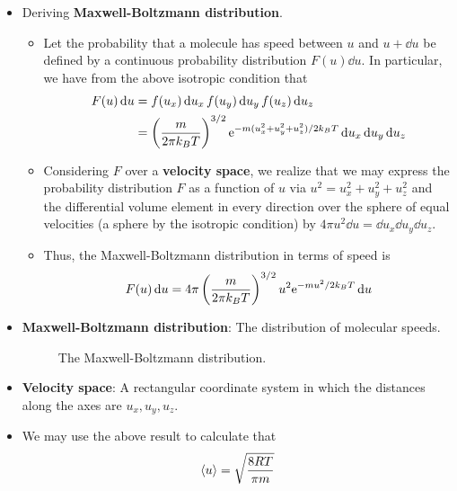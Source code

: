 \documentclass[../notes.tex]{subfiles}
\begin{document}
\begin{itemize}
    \item Deriving \textbf{Maxwell-Boltzmann distribution}.
    \begin{itemize}
        \item Let the probability that a molecule has speed between $u$ and $u+\dd{u}$ be defined by a continuous probability distribution $F(u)\dd{u}$. In particular, we have from the above isotropic condition that
        \begin{align*}
            F(u)\dd{u} &= f(u_x)\dd{u_x}f(u_y)\dd{u_y}f(u_z)\dd{u_z}\\
            &= \left( \frac{m}{2\pi k_BT} \right)^{3/2}\e[-m(u_x^2+u_y^2+u_z^2)/2k_BT]\dd{u_x}\dd{u_y}\dd{u_z}
        \end{align*}
        \item Considering $F$ over a \textbf{velocity space}, we realize that we may express the probability distribution $F$ as a function of $u$ via $u^2=u_x^2+u_y^2+u_z^2$ and the differential volume element in every direction over the sphere of equal velocities (a sphere by the isotropic condition) by $4\pi u^2\dd{u}=\dd{u_x}\dd{u_y}\dd{u_z}$.
        \item Thus, the Maxwell-Boltzmann distribution in terms of speed is
        \begin{equation*}
            F(u)\dd{u} = 4\pi\left( \frac{m}{2\pi k_BT} \right)^{3/2}u^2\e[-mu^2/2k_BT]\dd{u}
        \end{equation*}
    \end{itemize}
    \item \textbf{Maxwell-Boltzmann distribution}: The distribution of molecular speeds.
    \begin{figure}[H]
        \centering
        \caption{The Maxwell-Boltzmann distribution.}
        \label{fig:MBdist}
    \end{figure}
    \item \textbf{Velocity space}: A rectangular coordinate system in which the distances along the axes are $u_x,u_y,u_z$.
    \item We may use the above result to calculate that
    \begin{equation*}
        \prb{u} = \sqrt{\frac{8RT}{\pi m}}
    \end{equation*}

\end{itemize}
\end{document}
